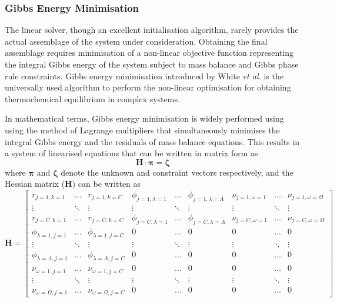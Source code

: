 	\subsubsection*{Gibbs Energy Minimisation}
    	The linear solver, though an excellent initialisation algorithm, rarely provides the actual assemblage of the system under consideration. Obtaining the final assemblage requires minimisation of a non-linear objective function representing the integral Gibbs energy of the system subject to mass balance and Gibbs phase rule constraints. Gibbs energy minimisation introduced by White \textit{et al.} \cite{White:58} is the universally used algorithm to perform the non-linear optimisation for obtaining thermochemical equilibrium in complex systems. 
    
    	In mathematical terms, Gibbs energy minimisation is widely performed using using the method of Lagrange multipliers that simultaneously minimises the integral Gibbs energy and the residuals of mass balance equations. This results in a system of linearised equations that can be written in matrix form as \cite{Piro11b}
    	\begin{equation*} \label{eqn:GEMintro}
        		\mathbf{H} \cdot \boldsymbol{\pi} = \boldsymbol{\zeta}
    	\end{equation*}
    	where $\boldsymbol{\pi}$ and $\boldsymbol{\zeta}$ denote the  unknown and constraint vectors respectively, and the Hessian matrix ($\mathbf{H}$) can be written as \cite{Piro11b,White:58}
    	\begin{equation*}
        \mathbf{H} = 
        			\begin{bmatrix}
            		r_{j=1,k=1} & \dots & r_{j=1,k=C} & \phi_{j=1,\lambda=1} & \dots & \phi_{j=1,\lambda=\Lambda} & \nu_{j=1,\omega=1} & \dots & \nu_{j=1,\omega=\Omega} \\
            		\vdots & \ddots & \vdots & \vdots & \ddots & \vdots & \vdots & \ddots & \vdots \\
            		r_{j=C,k=1} & \dots & r_{j=C,k=C} & \phi_{j=C,\lambda=1} & \dots & \phi_{j=C,\lambda=\Lambda} & \nu_{j=C,\omega=1} & \dots & \nu_{j=C,\omega=\Omega} \\
            		\phi_{\lambda=1,j=1} & \dots & \phi_{\lambda=1,j=C} & 0 & \dots & 0 & 0 & \dots & 0 \\
            		\vdots & \ddots & \vdots & \vdots & \ddots & \vdots & \vdots & \ddots & \vdots \\
            		\phi_{\lambda=\Lambda,j=1} & \dots & \phi_{\lambda=\Lambda,j=C} & 0 & \dots & 0 & 0 & \dots & 0 \\
            		\nu_{\omega=1,j=1} & \dots & \nu_{\omega=1,j=C} & 0 & \dots & 0 & 0 & \dots & 0 \\
            		\vdots & \ddots & \vdots & \vdots & \ddots & \vdots & \vdots & \ddots & \vdots \\
            		\nu_{\omega=\Omega,j=1} & \dots & \nu_{\omega=\Omega,j=C} & 0 & \dots & 0 & 0 & \dots & 0 
        			\end{bmatrix}
    	\end{equation*}
